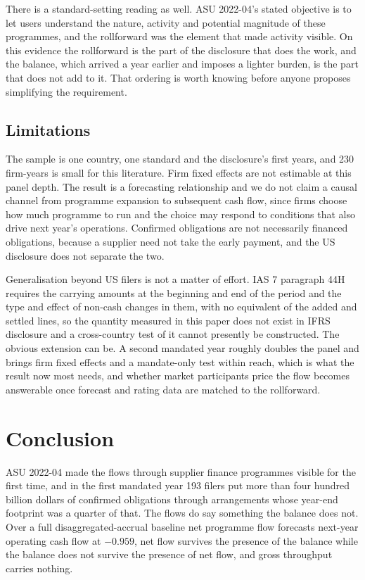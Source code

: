 \documentclass[conference,a4paper]{IEEEtran}
\begin{document}
There is a standard-setting reading as well. ASU 2022-04's stated objective is to
let users understand the nature, activity and potential magnitude of these
programmes, and the rollforward was the element that made activity visible. On
this evidence the rollforward is the part of the disclosure that does the work,
and the balance, which arrived a year earlier and imposes a lighter burden, is
the part that does not add to it. That ordering is worth knowing before anyone
proposes simplifying the requirement.

\subsection{Limitations}

The sample is one country, one standard and the disclosure's first years, and
230 firm-years is small for this literature. Firm fixed effects are not
estimable at this panel depth. The result is a forecasting relationship and we
do not claim a causal channel from programme expansion to subsequent cash flow,
since firms choose how much programme to run and the choice may respond to
conditions that also drive next year's operations. Confirmed obligations are not
necessarily financed obligations, because a supplier need not take the early
payment, and the US disclosure does not separate the two.

Generalisation beyond US filers is not a matter of effort. IAS 7 paragraph 44H
requires the carrying amounts at the beginning and end of the period and the
type and effect of non-cash changes in them, with no equivalent of the added and
settled lines, so the quantity measured in this paper does not exist in IFRS
disclosure and a cross-country test of it cannot presently be constructed. The
obvious extension can be. A second mandated year roughly doubles the panel and
brings firm fixed effects and a mandate-only test within reach, which is what
the result now most needs, and whether market participants price the flow
becomes answerable once forecast and rating data are matched to the rollforward.

\section{Conclusion}

ASU 2022-04 made the flows through supplier finance programmes visible for the
first time, and in the first mandated year 193 filers put more than four hundred
billion dollars of confirmed obligations through arrangements whose year-end
footprint was a quarter of that. The flows do say something the balance does
not. Over a full disaggregated-accrual baseline net programme flow forecasts
next-year operating cash flow at $-0.959$, net flow survives the presence of the
balance while the balance does not survive the presence of net flow, and gross
throughput carries nothing.
\end{document}
